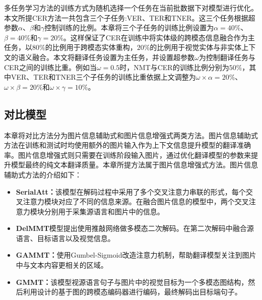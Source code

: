 多任务学习方法的训练方式为随机选择一个任务在当前批数据下对模型进行优化。本文所提CER方法一共包含三个子任务:VER、TER和TNER。这三个任务根据超参数$\alpha$、$\beta$和$\gamma$控制训练的比例。本章将三个子任务的训练比例设置为$\alpha=40\%$、$\beta=40\%$和$\gamma=20\%$。这样保证了CER在训练中将实体级的跨模态信息融合作为主任务，以$80\%$的比例用于跨模态实体重构，$20\%$的比例用于视觉实体与非实体上下文的语义融合。本文将翻译任务设置为主任务，并设置超参数$\omega$为控制翻译任务与CER之间的训练比重。例如当$\omega=0.5$时，NMT与CER的训练比例分别为$50\%$，其中VER、TER和TNER三个子任务的训练比重依据上文调整为$\omega\times\alpha=20\%$、$\omega\times\beta=20\%$和$\omega\times\gamma=10\%$。



\subsection{对比模型}
\label{sec:4_comparison}

本章将对比方法分为图片信息辅助式和图片信息增强式两类方法。图片信息辅助式方法在训练和测试时均使用额外的图片输入作为上下文信息提升模型的翻译准确率。图片信息增强式则只需要在训练阶段输入图片，通过优化翻译模型的参数来提升模型最终的纯文本翻译质量。本章所提方法属于图片信息增强式方法。图片信息辅助式方法的介绍如下：

\begin{itemize}

\item \textbf{SerialAtt\cite{47_DBLP:conf/wmt/LibovickyHM18}：}该模型在解码过程中采用了多个交叉注意力串联的形式，每个交叉注意力模块对应了不同的信息来源。在融合图片信息的模型中，两个交叉注意力模块分别用于采集源语言和图片中的信息。

\item \textbf{DelMMT\cite{39_ive-etal-2019-distilling}}模型提出使用推敲网络做多模态二次解码。在第二次解码中融合源语言、目标语言以及视觉信息。

\item \textbf{GAMMT\cite{41_DBLP:journals/corr/abs-2103-08862}：}使用Gumbel-Sigmoid改造注意力机制，帮助翻译模型关注到图片中与文本内容更相关的区域。

\item \textbf{GMMT\cite{33_yin-etal-2020-novel}：}该模型视源语言句子与图片中的视觉目标为一个多模态图结构，然后利用设计的基于图的跨模态编码器进行编码，最终解码出目标端句子。
\end{itemize}

